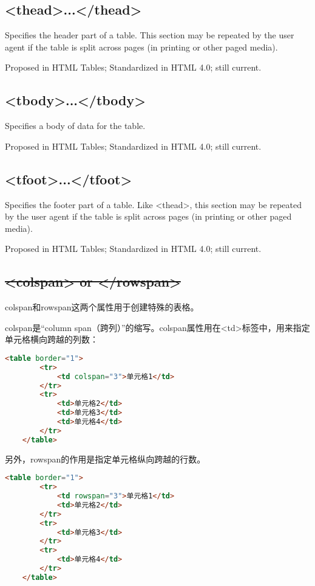 \subsection{<thead>...</thead>}

Specifies the header part of a table. This section may be repeated by the user agent if the table is split across pages (in printing or other paged media).


Proposed in HTML Tables; Standardized in HTML 4.0; still current.


\subsection{<tbody>...</tbody>}

Specifies a body of data for the table.

Proposed in HTML Tables; Standardized in HTML 4.0; still current.


\subsection{<tfoot>...</tfoot>}

Specifies the footer part of a table. Like <thead>, this section may be repeated by the user agent if the table is split across pages (in printing or other paged media).

Proposed in HTML Tables; Standardized in HTML 4.0; still current.

\subsection{\sout{<colspan> or </rowspan>}}

colspan和rowspan这两个属性用于创建特殊的表格。

colspan是“column span（跨列）”的缩写。colspan属性用在<td>标签中，用来指定单元格横向跨越的列数：

\begin{lstlisting}[language=HTML]
	<table border="1">
		<tr>
			<td colspan="3">单元格1</td>
		</tr>
		<tr>
			<td>单元格2</td>
			<td>单元格3</td>
			<td>单元格4</td>
		</tr>
	</table>
\end{lstlisting}

另外，rowspan的作用是指定单元格纵向跨越的行数。

\begin{lstlisting}[language=HTML]
	<table border="1">
		<tr>
			<td rowspan="3">单元格1</td>
			<td>单元格2</td>
		</tr>
		<tr>
			<td>单元格3</td>
		</tr>
		<tr>
			<td>单元格4</td>
		</tr>
	</table>
\end{lstlisting}

